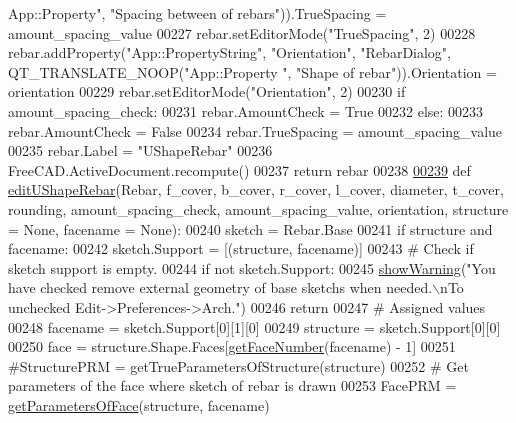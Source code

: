 \begin{DoxyCode}
{      App::Property"}, \textcolor{stringliteral}{"Spacing between of rebars"})).TrueSpacing = amount\_spacing\_value
00227     rebar.setEditorMode(\textcolor{stringliteral}{"TrueSpacing"}, 2)
00228     rebar.addProperty(\textcolor{stringliteral}{"App::PropertyString"}, \textcolor{stringliteral}{"Orientation"}, \textcolor{stringliteral}{"RebarDialog"}, QT\_TRANSLATE\_NOOP(\textcolor{stringliteral}{"App::Property
      "}, \textcolor{stringliteral}{"Shape of rebar"})).Orientation = orientation
00229     rebar.setEditorMode(\textcolor{stringliteral}{"Orientation"}, 2)
00230     \textcolor{keywordflow}{if} amount\_spacing\_check:
00231         rebar.AmountCheck = \textcolor{keyword}{True}
00232     \textcolor{keywordflow}{else}:
00233         rebar.AmountCheck = \textcolor{keyword}{False}
00234         rebar.TrueSpacing = amount\_spacing\_value
00235     rebar.Label = \textcolor{stringliteral}{"UShapeRebar"}
00236     FreeCAD.ActiveDocument.recompute()
00237     \textcolor{keywordflow}{return} rebar
00238 
\hypertarget{UShapeRebar_8py_source.tex_l00239}{}\hyperlink{namespaceUShapeRebar_a461f60869fd97a93fc015af4828467ee}{00239} \textcolor{keyword}{def }\hyperlink{namespaceUShapeRebar_a461f60869fd97a93fc015af4828467ee}{editUShapeRebar}(Rebar, f\_cover, b\_cover, r\_cover, l\_cover, diameter, t\_cover, rounding, 
      amount\_spacing\_check, amount\_spacing\_value, orientation, structure = None, facename = None):
00240     sketch = Rebar.Base
00241     \textcolor{keywordflow}{if} structure \textcolor{keywordflow}{and} facename:
00242         sketch.Support = [(structure, facename)]
00243     \textcolor{comment}{# Check if sketch support is empty.}
00244     \textcolor{keywordflow}{if} \textcolor{keywordflow}{not} sketch.Support:
00245         \hyperlink{namespaceRebarfunc_a2278a0602d46a62953af1fcf2e574a94}{showWarning}(\textcolor{stringliteral}{"You have checked remove external geometry of base sketchs when needed.\(\backslash\)nTo
       unchecked Edit->Preferences->Arch."})
00246         \textcolor{keywordflow}{return}
00247     \textcolor{comment}{# Assigned values}
00248     facename = sketch.Support[0][1][0]
00249     structure = sketch.Support[0][0]
00250     face = structure.Shape.Faces[\hyperlink{namespaceRebarfunc_a3885b3b63e3a41508ac79bc7550cf301}{getFaceNumber}(facename) - 1]
00251     \textcolor{comment}{#StructurePRM = getTrueParametersOfStructure(structure)}
00252     \textcolor{comment}{# Get parameters of the face where sketch of rebar is drawn}
00253     FacePRM = \hyperlink{namespaceRebarfunc_a92122b3d7cedd3d47bb63380a5ac4d08}{getParametersOfFace}(structure, facename)

\end{DoxyCode}
